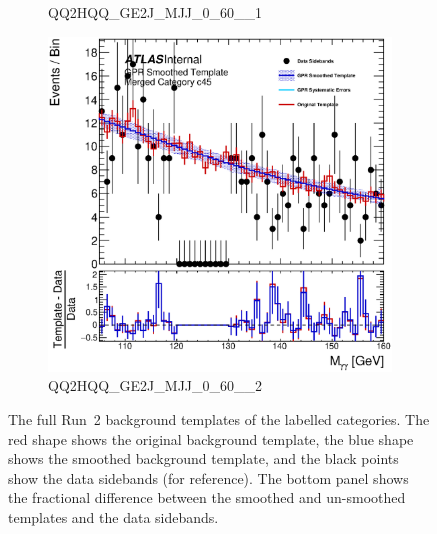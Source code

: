 \begin{figure}
\begin{center}
\begin{subfigure}[T]{0.49\linewidth}
	\caption{QQ2HQQ\_GE2J\_MJJ\_0\_60\_\_1}
\end{subfigure}
\begin{subfigure}[T]{0.49\linewidth}
	\centering
	\includegraphics[width=\linewidth]{figures/background/gpr/coupCatTemplates/GPR_Smoothed_Plot_hmgg_c45.eps}
	\caption{QQ2HQQ\_GE2J\_MJJ\_0\_60\_\_2}
\end{subfigure}
\caption{The full Run~2 background templates of the labelled categories. The red shape shows the original background template, the blue shape shows the smoothed background template, and the black points show the data sidebands (for reference). The bottom panel shows the fractional difference between the smoothed and un-smoothed templates and the data sidebands. }
\label{fig:gpr_coupcat_11}
\end{center}
\end{figure}

